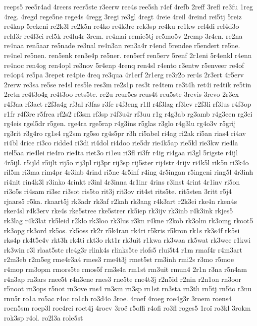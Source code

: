 {reeps5
ree5r4ad
4reers
reer5ste
r3eerw
ree4s
ree5sh
r4ef
4refb
2reff
3refl
re3fu
1reg
4reg.
4regd
rege5ne
rege4s
4regg
3regi
re3gl
4regt
4reie
4reil
4reind
rei5tj
5reiz
re4kap
5rekeni
re2k3l
re2k5n
re4ko
re4k3re
rek3sp
re4ku
re1kw
rel4di
rel4d3o
reld3r
re4l3ei
rel5k
re4lu4r
3rem.
re4mai
remie5tj
re5mo5v
2remp
3r4en.
re2na
re4naa
ren5aar
re5nade
re3nal
re4n3an
ren3a4r
r4end
5rendee
r5endert
re5ne.
re4nel
re5nen.
ren5enk
ren3e4p
re5ner.
ren5erf
ren5erv
5renf
2r1eni
5r4enkl
r4enn
re4noc
ren4og
ren4opl
re3nov
5r4enp
4renq
ren4sl
r4ento
r3entw
r5enveer
re4of
re4op4
re5pa
3repet
re4pie
4req
re3qua
4r1erf
2r1erg
re3r2o
rer4s
2r3ert
4r5erv
2rerw
re3sa
re5se
re4sl
res5le
res3m
re2s1p
res3t
re4tem
re3t4h
ret4i
re4tik
re5tin
2retn
re4t3o4g
re4t3oo
rets5te.
re2u
reur5es
reus4t
reu5ste
3revis
3revo
2r3ex
r4f3aa
rf3act
r2f3a4g
rf3al
r3fas
r3fe
r4f3eng
r1fl
r4f3lag
rf3lev
r2f3li
rf3lus
r4f3op
r1fr
r4f3re
r5frea
rf2s2
rf3sm
rf3sp
r4f3u4r
rf3uu
r1g
r4g3ab
rg3amb
r4g3een
rg3ei
rg4eis
rgel5dr
r5gen.
rge4ra
rge5rap
r4g3ins
r5glas
r3glo
r4g3lu
rg4o3v
r5grij
rg3rit
r3g4ro
rg1s4
rg2sm
rg5so
rg4s5pr
r3h
ri5abel
ri4ag
ri2ak
ri5an
rias4
ri4av
ri4bl
4rice
ri3co
ridde4
ri3di
ri4dol
ri4doo
rie5dr
rie4k5ap
rie5kl
rie3kw
rie4la
riel5aa
rie4lei
rie4ro
rie4ta
riet3o
ri1eu
ri3fl
ri3fr
r4ig
ri4gaa
ri3gl
5rigste
r4ijl
4r5ijl.
r5ijld
r5ijlt
rij5o
rij3pl
rij3pr
rij3sp
rij5ster
rij4str
4rijv
ri4k5l
rik5n
ri3k4o
ril5m
ri3ma
rim4pr
4r3inb
4rind
ri5ne
4r5inf
r4ing
4r5ingan
r5ingeni
ring5l
4r3inh
ri4nit
rin4k3l
r3inko
4rinkt
r3inl
4r3inna
4r1inr
4rins
r3inst
4rint
4r1inv
ri5on
ri3o5s
ri4sam
ri3sc
ri3sot
ris5to
rit3j
rit3ov
rit4st
rits5te.
rit5sten
3ritt
r5j4
rjaars5
r5ka.
rkaart5j
rk3adr
rk3af
r2kah
rk3ang
r4k3art
r2k3ei
rke4n
rken4s
rker4sl
r4k3erv
rke4s
rke5stree
rke5strer
rk5iep
rk3ijv
rk3inb
r4k3ink
rkjes5
rk3lag
r4k3lat
rk5leid
r2klo
rk3loo
rk3lus
r3kn
r4kne
r2kob
rk3olm
rk3omg
rkoot5
rk3opg
rk3ord
rk5os.
rk5oss
rk2r
r5k4ran
rk4ri
r5kris
r5kron
rk1s
rk3s4f
rk5si
rks4p
rk4t5e4v
rkt3h
rk4ti
rkt3o
rkt1r
rk3uit
r1kwa
rk3waa
rk5wat
rk3wee
r1kwi
rk3win
r3l
rlaat5ste
rle4g3r
rlink4s
rlinks5te
rlofs5
rlui5t4
r1m
rmaf4r
r4m3art
r2m3eb
r2m5eg
rme4r3a4
rmes3
rme4t3j
rmet5st
rm3inh
rmi2s
r3mo
r5moe
r4mop
rm3opm
rmors5te
rmos5f
rm3s4a
rm1st
rm3uit
rmun4
2r1n
r3na
r5n4am
r4n3ap
rn3ars
rnee5t
r4n3ene
rnes3
rne5te
rne4t3j
r2n5id
r2nin
r2n1on
rn3oor
r5noot
rn3ops
r5not
rn3ove
rns4
rn3sm
rn3sp
rn1st
rn3sta
rn3th
rn5tj
rn5to
r3nu
rnu5r
ro1a
ro5ac
r4oc
ro1ch
ro3d4o
3roe.
4roef
4roeg
roe4g3r
3roem
roens4
roen5sm
roep3l
roe4rei
roet4j
4roev
3roë
r5offi
r4ofi
ro3fl
roges5
1roï
ro3kl
3rokm
rok3sp
r4ol.
ro2l3a
role5st
}
